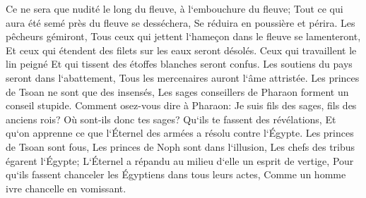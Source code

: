 \verse Ce ne sera que nudité le long du fleuve, à l`embouchure du fleuve; Tout ce qui aura été semé près du fleuve se desséchera, Se réduira en poussière et périra. 
\verse Les pêcheurs gémiront, Tous ceux qui jettent l`hameçon dans le fleuve se lamenteront, Et ceux qui étendent des filets sur les eaux seront désolés. 
\verse Ceux qui travaillent le lin peigné Et qui tissent des étoffes blanches seront confus. 
\verse Les soutiens du pays seront dans l`abattement, Tous les mercenaires auront l`âme attristée. 
\verse Les princes de Tsoan ne sont que des insensés, Les sages conseillers de Pharaon forment un conseil stupide. Comment osez-vous dire à Pharaon: Je suis fils des sages, fils des anciens rois? 
\verse Où sont-ils donc tes sages? Qu`ils te fassent des révélations, Et qu`on apprenne ce que l`Éternel des armées a résolu contre l`Égypte. 
\verse Les princes de Tsoan sont fous, Les princes de Noph sont dans l`illusion, Les chefs des tribus égarent l`Égypte; 
\verse L`Éternel a répandu au milieu d`elle un esprit de vertige, Pour qu`ils fassent chanceler les Égyptiens dans tous leurs actes, Comme un homme ivre chancelle en vomissant. 
